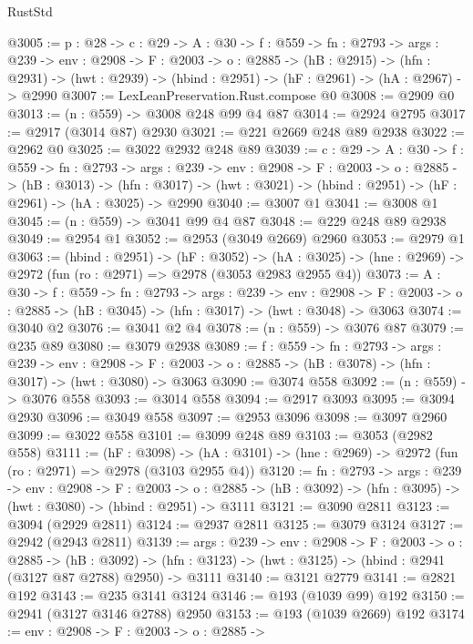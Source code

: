 \begin{lexlean}{RustStd}
\begin{coremodule}
@3005 := {p : @28} ->
  {c : @29} ->
  {A : @30} ->
  {f : @559} ->
  {fn : @2793} ->
  {args : @239} ->
  {env : @2908} ->
  {F : @2003} ->
  {o : @2885} ->
  (hB : @2915) ->
  (hfn : @2931) -> (hwt : @2939) -> (hbind : @2951) -> (hF : @2961) -> (hA : @2967) -> @2990
@3007 := LexLeanPreservation.Rust.compose @0
@3008 := @2909 @0
@3013 := (n : @559) -> @3008 @248 @99 @4 @87
@3014 := @2924 @2795
@3017 := @2917 (@3014 @87) @2930
@3021 := @221 @2669 @248 @89 @2938
@3022 := @2962 @0
@3025 := @3022 @2932 @248 @89
@3039 := {c : @29} ->
  {A : @30} ->
  {f : @559} ->
  {fn : @2793} ->
  {args : @239} ->
  {env : @2908} ->
  {F : @2003} ->
  {o : @2885} ->
  (hB : @3013) ->
  (hfn : @3017) -> (hwt : @3021) -> (hbind : @2951) -> (hF : @2961) -> (hA : @3025) -> @2990
@3040 := @3007 @1
@3041 := @3008 @1
@3045 := (n : @559) -> @3041 @99 @4 @87
@3048 := @229 @248 @89 @2938
@3049 := @2954 @1
@3052 := @2953 (@3049 @2669) @2960
@3053 := @2979 @1
@3063 := (hbind : @2951) ->
  (hF : @3052) ->
  (hA : @3025) -> (hne : @2969) -> @2972 (fun (ro : @2971) => @2978 (@3053 @2983 @2955 @4))
@3073 := {A : @30} ->
  {f : @559} ->
  {fn : @2793} ->
  {args : @239} ->
  {env : @2908} ->
  {F : @2003} -> {o : @2885} -> (hB : @3045) -> (hfn : @3017) -> (hwt : @3048) -> @3063
@3074 := @3040 @2
@3076 := @3041 @2 @4
@3078 := (n : @559) -> @3076 @87
@3079 := @235 @89
@3080 := @3079 @2938
@3089 := {f : @559} ->
  {fn : @2793} ->
  {args : @239} ->
  {env : @2908} ->
  {F : @2003} -> {o : @2885} -> (hB : @3078) -> (hfn : @3017) -> (hwt : @3080) -> @3063
@3090 := @3074 @558
@3092 := (n : @559) -> @3076 @558
@3093 := @3014 @558
@3094 := @2917 @3093
@3095 := @3094 @2930
@3096 := @3049 @558
@3097 := @2953 @3096
@3098 := @3097 @2960
@3099 := @3022 @558
@3101 := @3099 @248 @89
@3103 := @3053 (@2982 @558)
@3111 := (hF : @3098) ->
  (hA : @3101) -> (hne : @2969) -> @2972 (fun (ro : @2971) => @2978 (@3103 @2955 @4))
@3120 := {fn : @2793} ->
  {args : @239} ->
  {env : @2908} ->
  {F : @2003} ->
  {o : @2885} -> (hB : @3092) -> (hfn : @3095) -> (hwt : @3080) -> (hbind : @2951) -> @3111
@3121 := @3090 @2811
@3123 := @3094 (@2929 @2811)
@3124 := @2937 @2811
@3125 := @3079 @3124
@3127 := @2942 (@2943 @2811)
@3139 := {args : @239} ->
  {env : @2908} ->
  {F : @2003} ->
  {o : @2885} ->
  (hB : @3092) -> (hfn : @3123) -> (hwt : @3125) -> (hbind : @2941 (@3127 @87 @2788) @2950) -> @3111
@3140 := @3121 @2779
@3141 := @2821 @192
@3143 := @235 @3141 @3124
@3146 := @193 (@1039 @99) @192
@3150 := @2941 (@3127 @3146 @2788) @2950
@3153 := @193 (@1039 @2669) @192
@3174 := {env : @2908} ->
  {F : @2003} ->
  {o : @2885} ->

\end{coremodule}
\end{lexlean}
